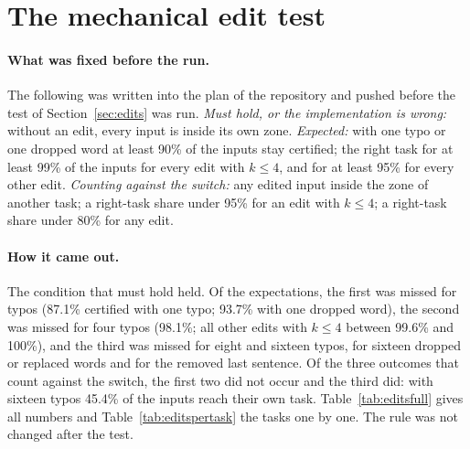 \begin{table}[h]
  \caption{Fifteen tasks: distance from the signature of each task to the nearest signature of an
  unrelated task and to the nearest signature of another task of the sequence (in brackets: which
  one). The smaller of the two that is known when the task arrives sets the radius
  (Eq.~\ref{eq:radius}).}
  \label{tab:distances}
  \centering
  \small
  
\end{table}

\begin{table}[h]
  \caption{Routes with other choices of the unrelated inputs $\mathcal{B}$ (CPU, T5-base
  word-vectors, final rule). Entries with four numbers are for the original / light / medium /
  heavy wording. ``Wrong'': inputs inside a foreign zone; ``Blocked'': training inputs inside an
  older zone; both over the two sequences. ``Radii'': smallest and largest radius in the 15-task
  sequence. In every row all inputs of the 15-task sequence with the original wording are
  certified.}
  \label{tab:background}
  \centering
  \footnotesize
  \setlength{\tabcolsep}{3pt}
  
\end{table}



\FloatBarrier
\section{The mechanical edit test}
\label{app:edits}

\paragraph{What was fixed before the run.} The following was written into the plan of the
repository and pushed before the test of Section~\ref{sec:edits} was run. \emph{Must hold, or the
implementation is wrong:} without an edit, every input is inside its own zone. \emph{Expected:}
with one typo or one dropped word at least 90\% of the inputs stay certified; the right task for at
least 99\% of the inputs for every edit with $k \le 4$, and for at least 95\% for every other edit.
\emph{Counting against the switch:} any edited input inside the zone of another task; a right-task
share under 95\% for an edit with $k \le 4$; a right-task share under 80\% for any edit.

\paragraph{How it came out.} The condition that must hold held. Of the expectations, the first was
missed for typos (87.1\% certified with one typo; 93.7\% with one dropped word), the second was
missed for four typos (98.1\%; all other edits with $k \le 4$ between 99.6\% and 100\%), and the
third was missed for eight and sixteen typos, for sixteen dropped or replaced words and for the
removed last sentence. Of the three outcomes that count against the switch, the first two did not
occur and the third did: with sixteen typos 45.4\% of the inputs reach their own task.
Table~\ref{tab:editsfull} gives all numbers and Table~\ref{tab:editspertask} the tasks one by one.
The rule was not changed after the test.

